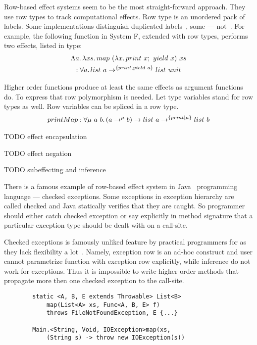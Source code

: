 \documentclass[conference]{IEEEtran}
\newcommand{\seq}{;~}
\newcommand{\ap}{~}
\begin{document}
    Row-based effect systems seem to be the most straight-forward approach.
    They use row types to track computational effects.
    Row type is an unordered pack of labels.
    Some implementations distinguish duplicated labels~\cite{koka}, some --- not~\cite{links}.
    For example, the following function in System F, extended with row types, performs two effects, listed in type:
    \begin{multline*}
        \Lambda a\ldotp\lambda xs\ldotp map \ap (\lambda x\ldotp print\ap x\seq yield\ap x) \ap xs \\ : \forall a \ldotp list\ap a \to^{\{print, yield \ap a\}} list \ap unit
    \end{multline*}

    Higher order functions produce at least the same effects as argument functions do.
    To express that row polymorphism is needed.
    Let type variables stand for row types as well.
    Row variables can be spliced in a row type.
    \begin{multline*}
        printMap : \forall \mu \ap a \ap b\ldotp (a \to^\mu b) \to list \ap a \to^{\{print|\mu\}} list \ap b
    \end{multline*}


    TODO effect encapsulation %

    TODO effect negation %

    TODO subeffecting and inference %

    There is a famous example of row-based effect system in Java~\cite{java} programming language --- checked exceptions.
    Some exceptions in exception hierarchy are called checked and Java statically verifies that they are caught.
    So programmer should either catch checked exception or say explicitly in method signature that a particular exception type should be dealt with on a call-site.

    Checked exceptions is famously unliked feature by practical programmers for as they lack flexibility a lot~\cite{checked-exceptions}.
    Namely, exception row is an ad-hoc construct and user cannot parametrize function with exception row explicitly, while inference do not work for exceptions.
    Thus it is impossible to write higher order methods that propagate more then one checked exception to the call-site.

    \begin{verbatim}
        static <A, B, E extends Throwable> List<B>
            map(List<A> xs, Func<A, B, E> f)
            throws FileNotFoundException, E {...}

        Main.<String, Void, IOException>map(xs,
            (String s) -> throw new IOException(s))
    \end{verbatim}
\end{document}
